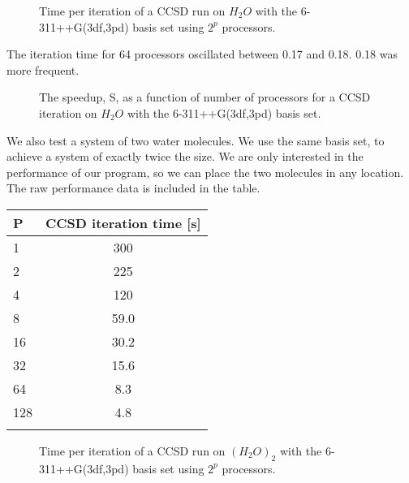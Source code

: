 \begin{figure}[h!]
\begin{center}
\caption{Time per iteration of a CCSD run on $H_2O$ with the 6-311++G(3df,3pd) basis set using $2^p$ processors.}
\label{fig:ccsd_h2o_time_per_iter}
\end{center}
\end{figure}

\newpage

The iteration time for 64 processors oscillated between 0.17 and 0.18. 0.18 was more frequent. \\

\begin{figure}[h!]
\begin{center}
\caption{The speedup, S, as a function of number of processors for a CCSD iteration on $H_2O$ with the 6-311++G(3df,3pd) basis set.}
\label{fig:ccsd_h2o_time_speedup}
\end{center}
\end{figure}

We also test a system of two water molecules. We use the same basis set, to achieve a system of exactly twice the size. We are only interested in the performance of our program, so we can place the two molecules in any location. The raw performance data is included in the table.

\begin{center}
\begin{tabular}{ l c}
	\hline
  	P & CCSD iteration time [s] \\ \hline
  	1 & 300   \\ 
  	2 & 225   \\ 
  	4 & 120   \\
  	8 &  59.0  \\ 
  	16 & 30.2   \\ 
  	32 & 15.6   \\ 
  	64 & 8.3  \\
  	128 & 4.8 \\ \hline
  	\\
	\end{tabular}
\end{center}


\begin{figure}[h!]
\begin{center}
\caption{Time per iteration of a CCSD run on $(H_2O)_2$ with the 6-311++G(3df,3pd) basis set using $2^p$ processors.}
\label{fig:ccsd_2h2o_time_per_iter}
\end{center}
\end{figure}

